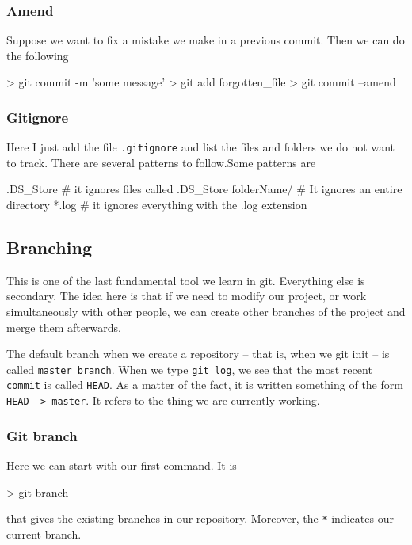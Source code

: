 \subsubsection{Amend}

Suppose we want to fix a mistake we make in a previous commit. Then we can do the following
\begin{listing}{1}
> git commit -m 'some message'
> git add forgotten_file 
> git commit --amend
\end{listing}

\subsubsection{Gitignore}

Here I just add the file \verb|.gitignore| and list the files and folders 
we do not want to track. 
There are several patterns to follow.Some patterns are 
\begin{listing}{1}
.DS_Store # it ignores files called .DS_Store
folderName/ # It ignores an entire directory
*.log # it ignores everything with the .log extension
\end{listing}

\subsection{Branching}

This is one of the last fundamental tool we learn in git. Everything 
else is secondary. The idea here is that if we need to modify our project, 
or work simultaneously with other people, we can create other branches 
of the project and merge them afterwards.

The default branch when we create a repository -- that is, when we git init -- 
is called \verb|master branch|. When we type \verb|git log|, we see that 
the most recent \verb|commit| is called \verb|HEAD|. As a matter of the fact, 
it is written something of the form \verb|HEAD -> master|. It refers
to the thing we are currently working.

\subsubsection{Git branch}

Here we can start with our first command. It is 
\begin{listing}{1}
> git branch
\end{listing}
that gives the existing branches in our repository. Moreover, the \verb|*| 
indicates our current branch.

